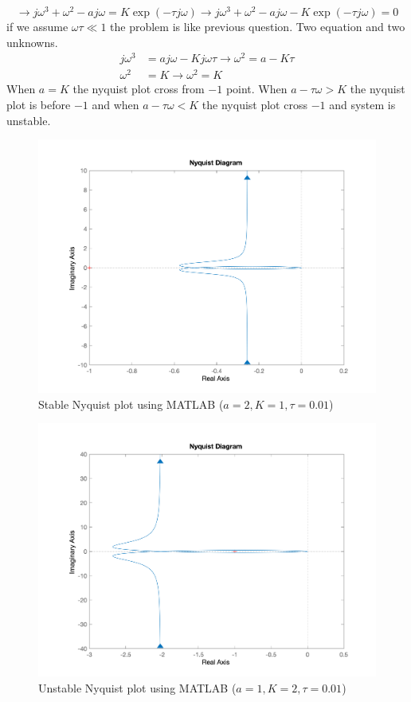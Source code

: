 $$
\to j\omega^3 + \omega^2 -aj\omega = K\exp(-\tau j\omega) \to j\omega^3 + \omega^2 -aj\omega - K\exp(-\tau j\omega) = 0
$$
if we assume $\omega\tau \ll 1$ the problem is like previous question.
Two equation and two unknowns.
\begin{align*}
	j\omega^3 &=aj\omega-Kj\omega\tau \to \omega^2 = a-K\tau\\
	\omega^2 &=K \to \omega^2 = K
\end{align*}
When $a = K$ the nyquist plot cross from $-1$ point. When $a-\tau\omega>K$ the nyquist plot is before $-1$ and when $a-\tau\omega<K$ the nyquist plot cross $-1$ and system is unstable.
\begin{figure}[H]
	\caption{Stable Nyquist plot using MATLAB ($a = 2, K = 1, \tau = 0.01$)}
	\centering
	\includegraphics[width=12cm]{../Figure/Q3/MATLAB-Nyquist_stable.png}
\end{figure} 
\begin{figure}[H]
	\caption{Unstable Nyquist plot using MATLAB ($a = 1, K = 2, \tau = 0.01$)}
	\centering
	\includegraphics[width=12cm]{../Figure/Q3/MATLAB-Nyquist_unstable.png}
\end{figure}

